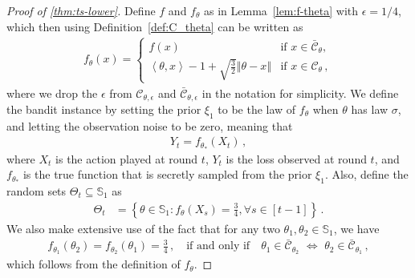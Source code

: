 \documentclass[letter, 12pt]{report}
\newcommand{\todoa}[2][]{\todo[size=\scriptsize,color=green!20!white,#1]{Alr: #2}}
\newcommand{\ip}[1]{\left \langle #1 \right \rangle}
\newcommand{\norm}[1]{\left \Vert  #1 \right \Vert}
\newcommand{\cC}{\mathcal C}
\newcommand{\bS}{\mathbb S}
\newcommand{\1}{\mathbf{1}}
\theoremstyle{plain}
\theoremstyle{definition}
\theoremstyle{remark}
\begin{document}
\begin{proof}[Proof of \cref{thm:ts-lower}]
    Define
    $f$ and $f_\theta$ as in Lemma~\ref{lem:f-theta}
    with $\epsilon = 1/4$,
    which then using Definition~\ref{def:C_theta} can be written as
    \begin{align*}
        f_\theta(x) =
        \begin{cases}
            f(x)                                                 & \text{if } x \in \bar{\cC}_{\theta}, \\
            \ip{\theta, x} - 1 + \sqrt{\frac32}\norm{\theta - x} & \text{if } x \in \cC_{\theta}\,,
        \end{cases}
    \end{align*}
    where we drop the $\epsilon$ from $\cC_{\theta, \epsilon}$
    and $\bar{\cC}_{\theta, \epsilon}$
    in the notation for simplicity.
    We define the bandit instance by
    setting the prior $\xi_1$ to be the law of $f_\theta$
    when $\theta$ has law $\sigma$,
    and letting the observation noise to be zero, meaning that
    \begin{align*}
        Y_t = f_{\theta_*}(X_t)\,,
    \end{align*}
    where $X_t$ is the action played at round $t$,
    $Y_t$ is the loss observed at round $t$,
    and $f_{\theta_*}$ is the true function
    that is secretly sampled from the prior $\xi_1$.
    Also, define the random sets $\Theta_t \subseteq \bS_1$ as
    \begin{align*}
        \Theta_t & =
        \left\{
        \theta \in \bS_1:
        f_\theta(X_s) = \frac34
        ,
        \forall s \in [t-1]
        \right\}
        \,.
    \end{align*}
    We also make extensive use of the fact that
    for any two $\theta_1, \theta_2 \in \bS_1$, we have
    \begin{align*}
        f_{\theta_1}(\theta_2)
        =
        f_{\theta_2}(\theta_1)
        =
        \frac34\,,
        \quad
        \text{if and only if}
        \quad
        \theta_1 \in \bar{\cC}_{\theta_2}
        \,\,
        \Leftrightarrow
        \,\,
        \theta_2 \in \bar{\cC}_{\theta_1}
        \,,
    \end{align*}
    which follows from the definition of $f_{\theta}$.


\end{proof}
\end{document}
